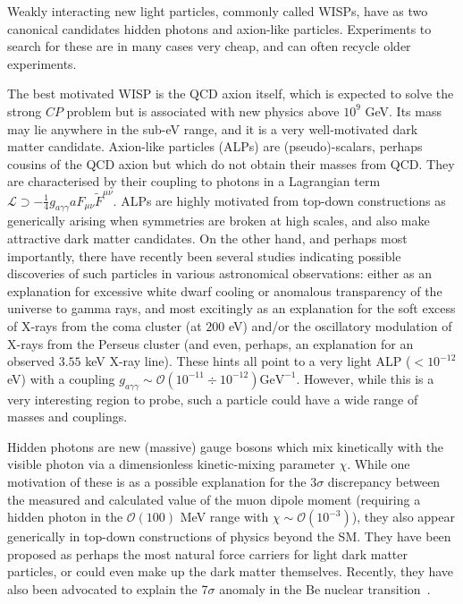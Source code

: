 Weakly interacting new light particles, commonly called WISPs, have as two canonical candidates  hidden photons and axion-like particles. Experiments to search for these are in many cases very cheap, and can often recycle older experiments.  

The best motivated WISP is the QCD axion itself, which is expected to solve the strong $CP$ problem but is associated with new physics above $10^9$ GeV. Its mass may lie anywhere in the sub-eV range, and it is a very well-motivated dark matter candidate.   Axion-like particles (ALPs) are (pseudo)-scalars, perhaps cousins of the QCD axion but which do not obtain their masses from QCD. They are characterised by their coupling to photons in a Lagrangian term $\mathcal{L} \supset - \frac{1}{4} g_{a\gamma \gamma} a F_{\mu \nu} \tilde{F}^{\mu \nu}.$ ALPs are highly motivated from top-down constructions as generically arising when symmetries are broken at high scales, and also make attractive dark matter candidates. On the other hand, and perhaps most importantly, there have recently been several studies indicating possible discoveries of such particles in various astronomical observations: either as an explanation for excessive white dwarf cooling or anomalous transparency of the universe to gamma rays, and most excitingly as an explanation for the soft excess of X-rays from the coma cluster (at $200$ eV) and/or the oscillatory modulation of X-rays from the Perseus cluster (and even, perhaps, an explanation for an observed $3.55$ keV X-ray line). These hints all point to a very light ALP ($< 10^{-12}$ eV) with a coupling $g_{a\gamma \gamma} \sim \mathcal{O}(10^{-11} \div 10^{-12}) \mathrm{GeV}^{-1}.$ However, while this is a very interesting region to probe, such a particle could have a wide range of masses and couplings. 

Hidden photons are new (massive) gauge bosons which mix kinetically with the visible photon via a dimensionless kinetic-mixing parameter $\chi$. While one motivation of these is as a possible explanation for the $3\sigma$ discrepancy between the measured and calculated value of the muon dipole moment (requiring a hidden photon in the $\mathcal{O}(100)$ MeV range with $\chi \sim \mathcal{O}(10^{-3})$), they also appear generically in top-down constructions of physics beyond the SM. They have been proposed as perhaps the most natural force carriers for light dark matter particles, or could even make up the dark matter themselves. Recently, they have also been advocated to explain the 7$\sigma$ anomaly in the Be nuclear transition~\cite{Krasznahorkay:2015iga}.  

